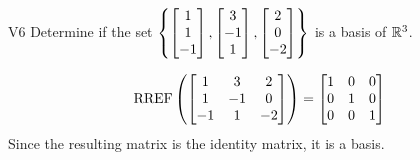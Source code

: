 \begin{problem}{V6}
Determine if the set \(\left\{\begin{bmatrix} 1 \\ 1 \\ -1 \end{bmatrix}, \begin{bmatrix} 3 \\ -1 \\ 1 \end{bmatrix},\begin{bmatrix} 2 \\ 0 \\ -2 \end{bmatrix}\right\}\) is a basis of \(\mathbb{R}^3\).
\end{problem}
\begin{solution}
\[\operatorname{RREF}\left(\begin{bmatrix} 1 & 3 & 2 \\ 1 & -1 & 0 \\ -1 & 1 & -2 \end{bmatrix} \right)= \begin{bmatrix} 1 & 0 &0 \\ 0 & 1 & 0 \\ 0 & 0 & 1\end{bmatrix}\]
Since the resulting matrix is the identity matrix, it is a basis.
\end{solution}





